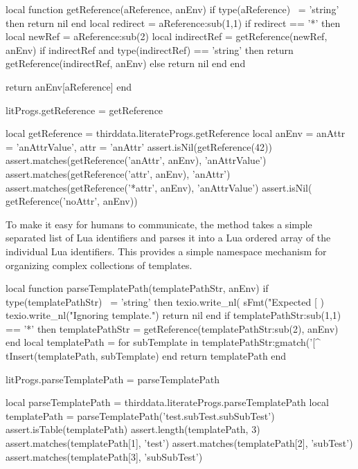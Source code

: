 {{\startLuaCode
local function getReference(aReference, anEnv)
  if type(aReference) ~= 'string' then return nil end
  local redirect = aReference:sub(1,1)
  if redirect == '*' then
    local newRef = aReference:sub(2)
    local indirectRef = getReference(newRef, anEnv)
    if indirectRef and type(indirectRef) == 'string' then
      return getReference(indirectRef, anEnv)
    else
      return nil
    end
  end

  return anEnv[aReference]
end

litProgs.getReference = getReference
\stopLuaCode

\startLuaTest
local getReference = thirddata.literateProgs.getReference
local anEnv = { 
  anAttr = 'anAttrValue',
  attr   = 'anAttr'
}
assert.isNil(getReference(42))
assert.matches(getReference('anAttr', anEnv), 'anAttrValue')
assert.matches(getReference('attr',   anEnv), 'anAttr')
assert.matches(getReference('*attr',  anEnv), 'anAttrValue')
assert.isNil(  getReference('noAttr', anEnv))
\stopLuaTest
\stopTestCase
\stopTestSuite

\startTestSuite[parseTemplatePath]

To make it easy for humans to communicate, the  
method takes a simple  separated list of Lua identifiers and 
parses it into a Lua ordered array of the individual Lua identifiers. This 
provides a simple namespace mechanism for organizing complex collections 
of templates. 

\startLuaCode
local function parseTemplatePath(templatePathStr, anEnv)
  if type(templatePathStr) ~= 'string' then
    texio.write_nl(
      sFmt("Expected [%
    )
    texio.write_nl("Ignoring template.")
    return nil
  end
  if templatePathStr:sub(1,1) == '*' then
    templatePathStr = getReference(templatePathStr:sub(2), anEnv)
  end
  local templatePath = { }
  for subTemplate in templatePathStr:gmatch('[^%
    tInsert(templatePath, subTemplate)
  end
  return templatePath
end

litProgs.parseTemplatePath = parseTemplatePath
\stopLuaCode

\startLuaTest
local parseTemplatePath = thirddata.literateProgs.parseTemplatePath
local templatePath = parseTemplatePath('test.subTest.subSubTest')
assert.isTable(templatePath)
assert.length(templatePath, 3)
assert.matches(templatePath[1], 'test')
assert.matches(templatePath[2], 'subTest')
assert.matches(templatePath[3], 'subSubTest')
\stopLuaTest
\stopTestCase

}}
